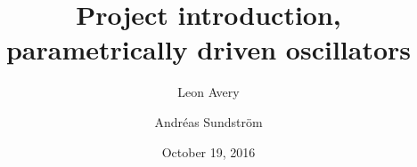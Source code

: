 \documentclass[swedish, english]{beamer}
\title[]{Project introduction, \\parametrically driven oscillators}
\subtitle{} %
\author{Leon Avery \and Andréas Sundström} %
\institute[UW]{University of Waterloo}
\date{October 19, 2016}
\begin{document}
\begin{frame}[plain]
\linethickness{0.075mm}
  \titlepage
\end{frame}
















\end{document}
